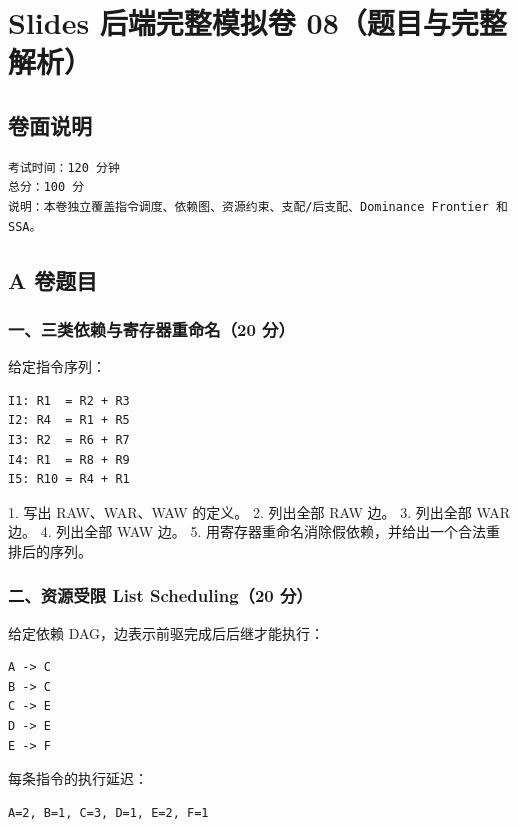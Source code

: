 \documentclass[UTF8]{ctexart}
\begin{document}
\section*{Slides 后端完整模拟卷 08（题目与完整解析）}

\subsection*{卷面说明}

\begin{Verbatim}[fontsize=\small,breaklines=true]
考试时间：120 分钟
总分：100 分
说明：本卷独立覆盖指令调度、依赖图、资源约束、支配/后支配、Dominance Frontier 和 SSA。
\end{Verbatim}

\subsection*{A 卷题目}

\subsubsection*{一、三类依赖与寄存器重命名（20 分）}

给定指令序列：

\begin{Verbatim}[fontsize=\small,breaklines=true]
I1: R1  = R2 + R3
I2: R4  = R1 + R5
I3: R2  = R6 + R7
I4: R1  = R8 + R9
I5: R10 = R4 + R1
\end{Verbatim}

1. 写出 RAW、WAR、WAW 的定义。 2. 列出全部 RAW 边。 3. 列出全部 WAR 边。 4. 列出全部 WAW 边。 5. 用寄存器重命名消除假依赖，并给出一个合法重排后的序列。

\subsubsection*{二、资源受限 List Scheduling（20 分）}

给定依赖 DAG，边表示前驱完成后后继才能执行：

\begin{Verbatim}[fontsize=\small,breaklines=true]
A -> C
B -> C
C -> E
D -> E
E -> F
\end{Verbatim}

每条指令的执行延迟：

\begin{Verbatim}[fontsize=\small,breaklines=true]
A=2, B=1, C=3, D=1, E=2, F=1
\end{Verbatim}
\end{document}
